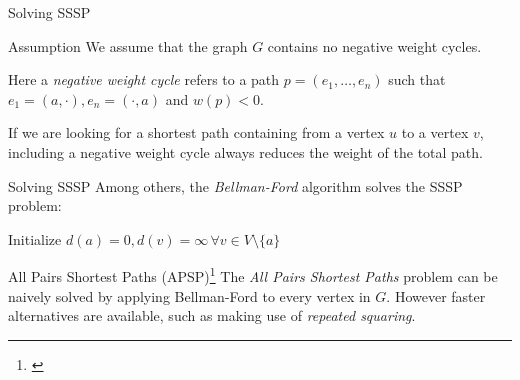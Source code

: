 \begin{frame}{Solving SSSP}
    \begin{exampleblock}{Assumption}
        We assume that the graph $G$ contains no negative weight cycles.

        Here a \emph{negative weight cycle} refers to a path $p = (e_1, \dots, e_n)$ such that $e_1 = (a, \cdot), e_n = (\cdot, a)$ and $w(p) < 0$.

        If we are looking for a shortest path containing from a vertex $u$ to a vertex $v$, including a negative weight cycle always reduces the weight of the total path. \Lightning{}
    \end{exampleblock}
\end{frame}

\begin{frame}{Solving SSSP}
    Among others, the \emph{Bellman-Ford} algorithm solves the SSSP problem:

    \begin{algorithm}[H]
        Initialize $d(a) = 0, d(v) = \infty \,\forall v \in V \setminus \{ a \}$\;
    \end{algorithm}


\end{frame}

\begin{frame}{All Pairs Shortest Paths (APSP)\footnote[1]{\cite[Section~25.1]{Cormen2001}}}
    The \emph{All Pairs Shortest Paths} problem can be naively solved by applying Bellman-Ford to every vertex in $G$.
    However faster alternatives are available, such as making use of \emph{repeated squaring}.
    
\end{frame}

